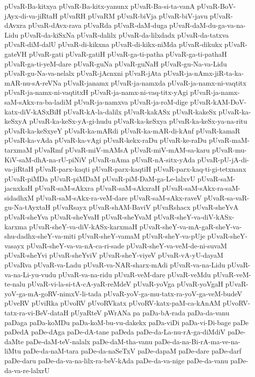 {pUvaR-Ba-kitxya
pUvaR-Ba-kitx-yanunx
pUvaR-Ba-si-ta-vanA
pUvaR-BoV-jAyx-di-va-jiRtaH
pUvaRH
pUvaRM
pUvaR-biVja
pUvaR-biV-javu
pUvaR-dAvxra
pUvaR-dAvx-rava
pUvaRda
pUvaR-daM-duga
pUvaR-daM-du-ga-va-na-Lidu
pUvaR-da-kiSxNa
pUvaR-dalilx
pUvaR-da-lilxdadx
pUvaR-da-tatxva
pUvaR-diM-dalU
pUvaR-di-kikxna
pUvaR-di-kikx-niMda
pUvaR-dikukx
pUvaR-gateVH
pUvaR-gati
pUvaR-gatiH
pUvaR-ga-ti-patha
pUvaR-ga-ti-pathaH
pUvaR-ga-ti-yeM-dare
pUvaR-guNa
pUvaR-guNaH
pUvaR-gu-Na-va-Lidu
pUvaR-gu-Na-va-nelalx
pUvaR-jAcnxni
pUvaR-jAta
pUvaR-ja-nAmx-jiR-ta-ka-mAR-nu-sA-reVNa
pUvaR-janamx
pUvaR-ja-namxda
pUvaR-ja-namx-ni-vaqtitx
pUvaR-ja-namx-ni-vaqtitxH
pUvaR-ja-namx-ni-vaq-titx-yAgi
pUvaR-ja-namx-saM-sAkx-ra-ba-ladiM
pUvaR-ja-namxva
pUvaR-ja-roM-dige
pUvaR-kAM-DoV-katx-diV-kASxBiH
pUvaR-kA-la-dalilx
pUvaR-kakASx
pUvaR-kakeSx
pUvaR-ka-keSxyA
pUvaR-ka-keSx-yA-gi-hudu
pUvaR-ka-keSxya
pUvaR-ka-keSx-ya-na-ritu
pUvaR-ka-keSxyeY
pUvaR-ka-mARdi
pUvaR-ka-mAR-di-kAnf
pUvaR-kamaR
pUvaR-ka-vAda
pUvaR-ka-vAgi
pUvaR-kekx-raDu
pUvaR-ke-raDu
pUvaR-maM-tarxmaM
pUvaRmf
pUvaR-miV-mAMsA
pUvaR-miV-mAM-sa-karu
pUvaR-mu-KiV-saM-dhA-na-rU-piNiV
pUvaR-nAma
pUvaR-nA-sitx-yAda
pUvaR-pU-jA-di-va-jiRtaH
pUvaR-parx-kaqti
pUvaR-parx-kaqtiH
pUvaR-parx-kaq-ti-gi-tetxnanx
pUvaR-piMDa
pUvaR-piMDaM
pUvaR-piM-DaM-ga-Le-lalxvU
pUvaR-saM-jacnxkaH
pUvaR-saM-sAkxra
pUvaR-saM-sAkxraH
pUvaR-saM-sAkx-ra-saM-sidadhxM
pUvaR-saM-sAkx-ra-veM-dare
pUvaR-saM-sAkx-raveV
pUvaR-sa-vaR-gu-Na-tAyxtaH
pUvaRsayx
pUvaR-shAM-BaviV
pUvaRshacx
pUvaR-sheYvA
pUvaR-sheYva
pUvaR-sheYvaH
pUvaR-sheYvaM
pUvaR-sheY-va-diV-kASx-karxma
pUvaR-sheY-va-diV-kASx-karxmaH
pUvaR-sheY-va-mA-gaR-sheY-va-shu-dadhx-sheY-va-miti
pUvaR-sheY-vamaM
pUvaR-sheY-va-pUje
pUvaR-sheY-vasayx
pUvaR-sheY-va-va-nA-ca-ri-sade
pUvaR-sheY-va-veM-de-ni-suvaM
pUvaR-sheYvi
pUvaR-sheYviV
pUvaR-sheY-viyeV
pUvaR-vA-yU-dayaM
pUvaRva
pUvaR-va-Ladu
pUvaR-va-NAR-sharx-mAdi
pUvaR-va-na-Lidu
pUvaR-va-na-Li-yu-vudu
pUvaR-va-na-ridu
pUvaR-veM-dare
pUvaR-veMdu
pUvaR-veM-te-nalu
pUvaR-vi-la-si-tA-cA-yaR-reMdeV
pUvaR-yoVga
pUvaR-yoVgaH
pUvaR-yoV-ga-mA-goRV-nimxV-li-tada
pUvaR-yoV-ga-mu-tatx-ra-yoV-ga-veM-budeV
pUveRV
pUviRka
pUvoRV
pUvoRVkatx
pUvoRV-katx-paM-ca-kAnAM
pUvoRV-tatx-ra-vi-BeV-dataH
pUyaRteV
pWrANa
pa
paDa-bA-rada
paDa-da-vanu
paDaga
paDa-koMDu
paDa-koM-bu-vu-dakekx
paDa-viDi
paDa-vi-Di-bage
paDe
paDedA
paDe-dAga
paDe-dA-tane
paDeda
paDe-da-La-nu-rA-ga-diMdiV
paDe-daMte
paDe-daM-teV-nalalx
paDe-daM-tha-vanu
paDe-da-na-Bi-rA-ma-ve-na-liMtu
paDe-da-naM-tara
paDe-da-naSeTxV
paDe-dapaM
paDe-dare
paDe-darf
paDe-daru
paDe-da-va-na-lilx-ra-beV-kAda
paDe-da-va-nige
paDe-da-vanu
paDe-da-va-re-lalxrU
}
